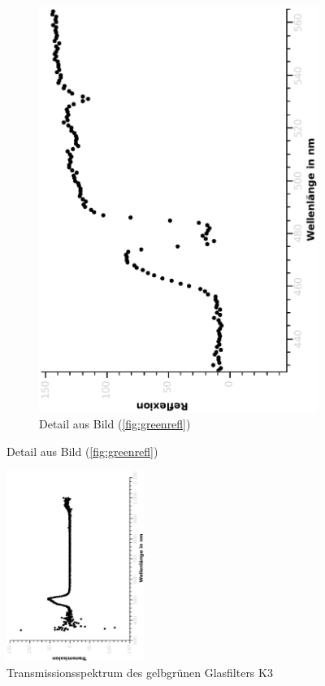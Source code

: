\documentclass{article}
\begin{document}
\begin{figure}[H]
\begin{subfigure}[h]{0.4\textwidth}
\includegraphics[width=\textwidth ,angle=-90]{eps/interrefldetail.eps}
\caption{Detail aus Bild (\ref{fig:greenrefl})}
\end{subfigure}
\end{figure}

\begin{figure}
\centering
\includegraphics[width=0.4\textwidth, angle=-90]{eps/glasfilterk3.eps}
\caption{Transmissionsspektrum \label{fig:glasfilter} des gelbgrünen Glasfilters K3}
\end{figure}
\end{document}

